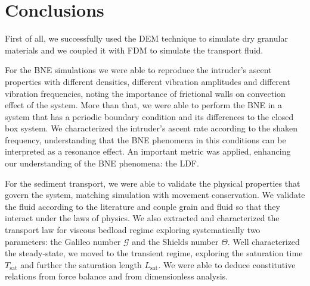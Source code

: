 
\chapter{Conclusions}
\label{chap:Conclusao}
    First of all, we successfully used the DEM technique to simulate dry granular materials and we coupled it with FDM to simulate the transport fluid.

    For the BNE simulations we were able to reproduce the intruder's ascent properties with different densities, different vibration amplitudes and different vibration frequencies, noting the importance of frictional walls on convection effect of the system. More than that, we were able to perform the BNE in a system that has a periodic boundary condition and its differences to the closed box system. We characterized the intruder's ascent rate according to the shaken frequency, understanding that the BNE phenomena in this conditions can be interpreted as a resonance effect. An important metric was applied, enhancing our understanding of the BNE phenomena: the LDF.


    For the sediment transport, we were able to validate the physical properties that govern the system, matching simulation with movement conservation. We validate the fluid according to the literature and couple grain and fluid so that they interact under the laws of physics. We also extracted and characterized the transport law for viscous bedload regime exploring systematically two parameters: the Galileo number $\mathcal{G}$ and the Shields number $\Theta$. Well characterized the steady-state, we moved to the transient regime, exploring the saturation time $T_\textrm{sat}$ and further the saturation length $L_\textrm{sat}$. We were able to deduce constitutive relations from force balance and from dimensionless analysis.

